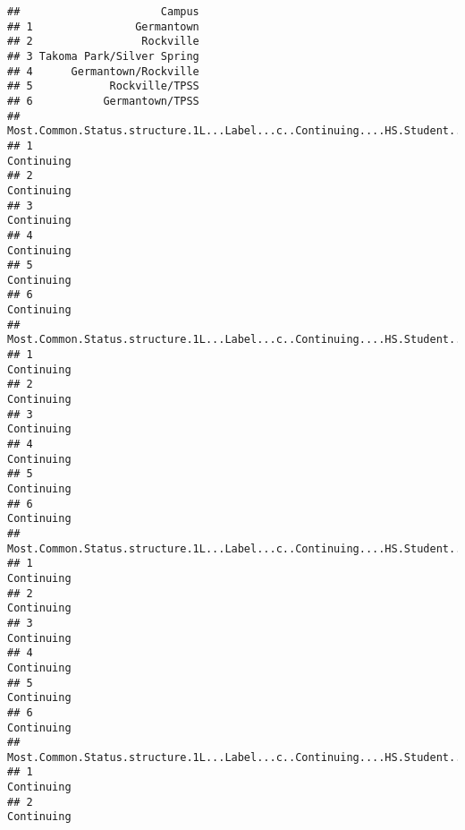 \documentclass[]{article}
\begin{document}
\begin{verbatim}
##                      Campus
## 1                Germantown
## 2                 Rockville
## 3 Takoma Park/Silver Spring
## 4      Germantown/Rockville
## 5            Rockville/TPSS
## 6           Germantown/TPSS
##   Most.Common.Status.structure.1L...Label...c..Continuing....HS.Student....New....New.No.HS...
## 1                                                                                   Continuing
## 2                                                                                   Continuing
## 3                                                                                   Continuing
## 4                                                                                   Continuing
## 5                                                                                   Continuing
## 6                                                                                   Continuing
##   Most.Common.Status.structure.1L...Label...c..Continuing....HS.Student....New....New.No.HS....1
## 1                                                                                     Continuing
## 2                                                                                     Continuing
## 3                                                                                     Continuing
## 4                                                                                     Continuing
## 5                                                                                     Continuing
## 6                                                                                     Continuing
##   Most.Common.Status.structure.1L...Label...c..Continuing....HS.Student....New....New.No.HS....2
## 1                                                                                     Continuing
## 2                                                                                     Continuing
## 3                                                                                     Continuing
## 4                                                                                     Continuing
## 5                                                                                     Continuing
## 6                                                                                     Continuing
##   Most.Common.Status.structure.1L...Label...c..Continuing....HS.Student....New....New.No.HS....3
## 1                                                                                     Continuing
## 2                                                                                     Continuing

\end{verbatim}
\end{document}
